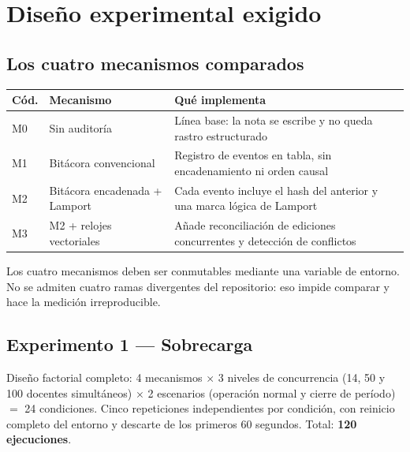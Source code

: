 \documentclass[11pt,a4paper]{article}
\begin{document}
\section{Diseño experimental exigido}

\subsection{Los cuatro mecanismos comparados}

\begin{center}
	\small
	\begin{tabular}{@{}p{1.3cm}p{5.0cm}p{8.7cm}@{}}
		\toprule
		\textbf{Cód.} & \textbf{Mecanismo} & \textbf{Qué implementa} \\
		\midrule
		M0 & Sin auditoría & Línea base: la nota se escribe y no queda rastro estructurado \\
		\addlinespace
		M1 & Bitácora convencional & Registro de eventos en tabla, sin encadenamiento ni orden causal \\
		\addlinespace
		M2 & Bitácora encadenada + Lamport & Cada evento incluye el hash del anterior y una marca lógica de Lamport \\
		\addlinespace
		M3 & M2 + relojes vectoriales & Añade reconciliación de ediciones concurrentes y detección de conflictos \\
		\bottomrule
	\end{tabular}
\end{center}

Los cuatro mecanismos deben ser conmutables mediante una variable de entorno. No se admiten cuatro ramas divergentes del repositorio: eso impide comparar y hace la medición irreproducible.

\subsection{Experimento 1 --- Sobrecarga}

Diseño factorial completo: 4 mecanismos $\times$ 3 niveles de concurrencia (14, 50 y 100 docentes simultáneos) $\times$ 2 escenarios (operación normal y cierre de período) $=$ 24 condiciones. Cinco repeticiones independientes por condición, con reinicio completo del entorno y descarte de los primeros 60 segundos. Total: \textbf{120 ejecuciones}.
\end{document}
